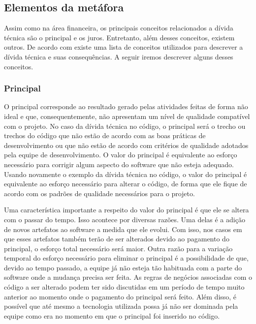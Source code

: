 \subsection{Elementos da metáfora}
\label{elementos_td}

Assim como na área financeira, os principais conceitos relacionados a dívida técnica são o principal e os juros. Entretanto, além desses conceitos, existem outros. De acordo com \cite{li2015systematic} existe uma lista de conceitos utilizados para descrever a dívida técnica e suas consequências. A seguir iremos descrever alguns desses conceitos.


\subsubsection{Principal}
O principal corresponde ao resultado gerado pelas atividades feitas de forma não ideal e que, consequentemente, não apresentam um nível de qualidade compatível com o projeto. No caso da dívida técnica no código, o principal será o trecho ou trechos do código que não estão de acordo com as boas práticas de desenvolvimento ou que não estão de acordo com critérios de qualidade adotados pela equipe de desenvolvimento. O valor do principal é equivalente ao esforço necessário para corrigir algum aspecto do software que não esteja adequado. Usando novamente o exemplo da dívida técnica no código, o valor do principal é equivalente ao esforço necessário para alterar o código, de forma que ele fique de acordo com os padrões de qualidade necessários para o projeto.

Uma característica importante a respeito do valor do principal é que ele se altera com o passar do tempo. Isso acontece por diversas razões. Uma delas é a adição de novos artefatos ao software a medida que ele evolui. Com isso, nos casos em que esses artefatos também terão de ser alterados devido ao pagamento do principal, o esforço total necessário será maior. Outra razão para a variação temporal do esforço necessário para eliminar o principal é a possibilidade de que, devido ao tempo passado, a equipe já não esteja tão habituada com a parte do software onde a mudança precisa ser feita. As regras de negócios associadas com o código a ser alterado podem ter sido discutidas em um período de tempo muito anterior ao momento onde o pagamento do principal será feito. Além disso, é possível que até mesmo a tecnologia utilizada possa já não ser dominada pela equipe como era no momento em que o principal foi inserido no código. 

